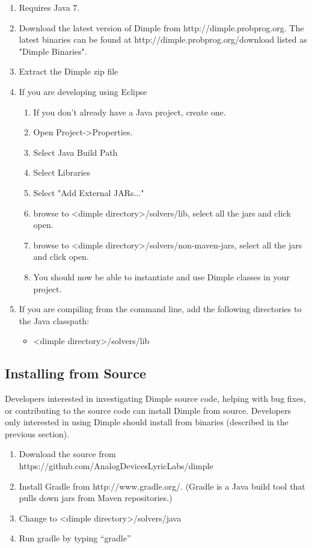 \fi

\ifjava

\begin{enumerate}
\item Requires Java 7.
\item Download the latest version of Dimple from http://dimple.probprog.org.  The latest binaries can be found at http://dimple.probprog.org/download listed as "Dimple Binaries".
\item Extract the Dimple  zip file
\item If you are developing using Eclipse
\begin{enumerate}
\item If you don't already have a Java project, create one.
\item Open Project-\textgreater Properties.
\item Select Java Build Path
\item Select Libraries
\item Select "Add External JARs..."
\item browse to \textless dimple directory\textgreater /solvers/lib, select all the jars and click open.
\item browse to \textless dimple directory\textgreater /solvers/non-maven-jars, select all the jars and click open.
\item You should now be able to instantiate and use Dimple classes in your project.
\end{enumerate}
\item If you are compiling from the command line, add the following directories to the Java classpath:
\begin{itemize}
\item \textless dimple directory\textgreater /solvers/lib
\end{itemize}
\end{enumerate}

\fi

\subsection{Installing from Source}

Developers interested in investigating Dimple source code, helping with bug fixes, or contributing to the source code can install Dimple from source.  Developers only interested in using Dimple should install from binaries (described in the previous section).

\begin{enumerate}
\item Download the source from https://github.com/AnalogDevicesLyricLabs/dimple
\item Install Gradle from http://www.gradle.org/.  (Gradle is a Java build tool that pulls down jars from Maven repositories.)
\item Change to \textless dimple directory\textgreater /solvers/java 
\item Run gradle by typing ``gradle''
\end{enumerate}

